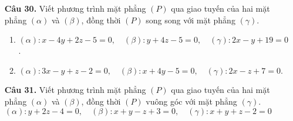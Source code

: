 \documentclass[12pt, a4paper]{article}
\begin{document}
\begin{enumerate}[label=\textbf{\arabic*.}, wide=0pt, leftmargin=*]
    \item[\textbf{Câu 30.}] Viết phương trình mặt phẳng \((P)\) qua giao tuyến của hai mặt phẳng \((\alpha)\) và \((\beta)\), đồng thời \((P)\) song song với mặt phẳng \((\gamma)\).
    \begin{enumerate}[label=\alph*)]
        \item \((\alpha): x-4y+2z-5=0, \quad (\beta): y+4z-5=0, \quad (\gamma): 2x-y+19=0\).
        \item \((\alpha): 3x-y+z-2=0, \quad (\beta): x+4y-5=0, \quad (\gamma): 2x-z+7=0\).
    \end{enumerate}

    \item[\textbf{Câu 31.}] Viết phương trình mặt phẳng \((P)\) qua giao tuyến của hai mặt phẳng \((\alpha)\) và \((\beta)\), đồng thời \((P)\) vuông góc với mặt phẳng \((\gamma)\).\\
    \((\alpha): y+2z-4=0, \quad (\beta): x+y-z+3=0, \quad (\gamma): x+y+z-2=0\)
\end{enumerate}

\end{document}
